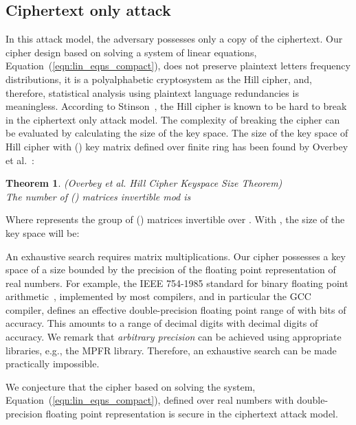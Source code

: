 \documentclass[10pt,journal]{IEEEtran}
\newtheorem{theorem}{Theorem}[]
\begin{document}
\subsection{Ciphertext only attack} \label{ssec:ciphertext_attack}
In this attack model, the adversary possesses only a copy of the
ciphertext.  Our cipher design based on solving a system of linear
equations, Equation~(\ref{eqn:lin_eqns_compact}), does not preserve
plaintext letters frequency distributions, it is a polyalphabetic
cryptosystem as the Hill cipher, and, therefore, statistical analysis 
using plaintext language redundancies is meaningless. According to 
Stinson~\cite{stinson-2005}, the Hill cipher is known to be hard to 
break in the ciphertext only attack model. The complexity of breaking 
the cipher can be evaluated by calculating the size of the key space. 
The size of the key space of Hill cipher with () key matrix 
defined over finite ring  has been found by 
Overbey et al.~\cite{overbey-2005}:

\begin{theorem}\emph{(Overbey et al. Hill Cipher Keyspace Size Theorem)}\\
The number of () matrices invertible mod  is

\end{theorem}

Where  represents the group of () matrices 
invertible over . With , the size of the key space 
will be:
\footnotesize{

}
\normalsize
 
An exhaustive search requires  matrix multiplications.
Our cipher possesses a key space of a size bounded by the precision
of the floating point representation of real numbers. For example, the 
IEEE 754-1985 standard for binary floating point arithmetic~\cite{IEEE754-1985}, 
implemented by most compilers, and in particular the GCC compiler, defines an effective double-precision floating point range of 
 with  bits of accuracy. 
This amounts to a range of  decimal digits with 
 decimal digits of accuracy. We remark that 
\emph{arbitrary precision} can be achieved 
using appropriate libraries, e.g., the MPFR library. 
Therefore, an exhaustive search can be made practically 
impossible. 
\newline

We conjecture that the cipher based on solving the system, 
Equation~(\ref{eqn:lin_eqns_compact}), defined over real numbers 
with double-precision floating point representation is secure in the 
ciphertext attack model.
\newline
\end{document}
